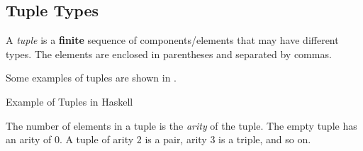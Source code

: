 \subsection{Tuple Types}\label{subsec:Tuple_Types}
\begin{definition}[Tuple]\label{def:Tuple}
  A \emph{tuple} is a \textbf{finite} sequence of components/elements that may have different types.
  The elements are enclosed in parentheses and separated by commas.

  Some examples of tuples are shown in .
\end{definition}

\begin{listing}[h!tbp]
\caption{Example of Tuples in Haskell}
\label{lst:Tuple_Examples}
\end{listing}

The number of elements in a tuple is the \emph{arity} of the tuple.
The empty tuple has an arity of 0.
A tuple of arity 2 is a pair, arity 3 is a triple, and so on.


